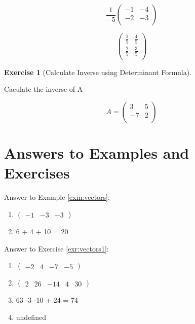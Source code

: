 \documentclass[
]{book}
\providecommand{\tightlist}{%
  \setlength{\itemsep}{0pt}\setlength{\parskip}{0pt}}
\theoremstyle{definition}
\theoremstyle{definition}
\theoremstyle{definition}
\newtheorem{exercise}{Exercise}[chapter]
\theoremstyle{definition}
\theoremstyle{remark}
\begin{document}
\[\frac{1}{-5} \begin{pmatrix}
            -1 & -4\\
            -2 & -3\\
        \end{pmatrix}\]

\[ \begin{pmatrix}
            \frac{1}{5} & \frac{4}{5}\\
            \frac{2}{5} & \frac{3}{5}\\
        \end{pmatrix}\]

\begin{exercise}[Calculate Inverse using Determinant Formula]
\protect\hypertarget{exr:calcinverse}{}{\label{exr:calcinverse} {} }

Caculate the inverse of A

\[A = \begin{pmatrix}
            3 & 5\\
            -7 & 2\\
        \end{pmatrix}\]
\end{exercise}

\hypertarget{answers-to-examples-and-exercises-1}{%
\section*{Answers to Examples and Exercises}\label{answers-to-examples-and-exercises-1}}

Answer to Example \ref{exm:vectors}:

\begin{enumerate}
\def\labelenumi{\arabic{enumi}.}
\tightlist
\item
  \(\begin{pmatrix} -1 &-3&-3 \end{pmatrix}\)
\item
  6 + 4 + 10 = 20
\end{enumerate}

Answer to Exercise \ref{exr:vectors1}:

\begin{enumerate}
\def\labelenumi{\arabic{enumi}.}
\tightlist
\item
  \(\begin{pmatrix} -2 &4&-7&-5 \end{pmatrix}\)
\item
  \(\begin{pmatrix} 2 &26&-14&4&30 \end{pmatrix}\)
\item
  63 -3 -10 + 24 = 74
\item
  undefined
\end{enumerate}
\end{document}
